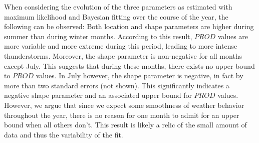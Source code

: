 \documentclass[10pt,conference,compsocconf]{IEEEtran}
\begin{document}
When considering the evolution of the three parameters as estimated with maximum likelihood and Bayesian fitting over the course of the year, the following can be observed: Both location and shape parameters are higher during summer than during winter months. According to this result, $PROD$ values are more variable and more extreme during this period, leading to more intense thunderstorms. Moreover, the shape parameter is non-negative for all months except July. This suggests that during these months, there exists no upper bound to $PROD$ values. In July however, the shape parameter is negative, in fact by more than two standard errors (not shown). This significantly indicates a negative shape parameter and an associated upper bound for $PROD$ values. However, we argue that since we expect some smoothness of weather behavior throughout the year, there is no reason for one month to admit for an upper bound when all others don't. This result is likely a relic of the small amount of data and thus the variability of the fit. 
\end{document}
